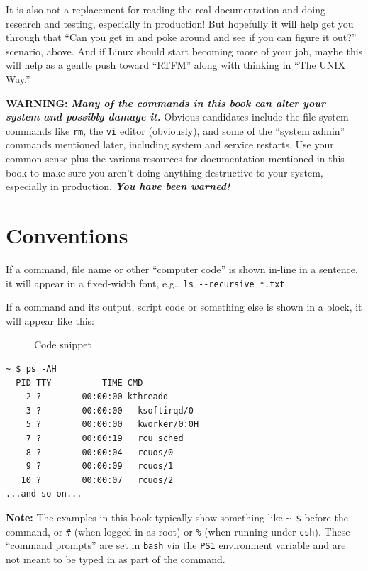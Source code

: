 \documentclass[10pt,]{book}
\numberwithin{figure}{chapter}
\DeclareRobustCommand{\drcap}[1]{\begin{figure}[H]\caption{#1}\end{figure}}
\DeclareRobustCommand{\drenv}[1]{\index{Environment Variables!#1}}
\begin{document}
It is also not a replacement for reading the real documentation and
doing research and testing, especially in production! But hopefully it
will help get you through that ``Can you get in and poke around and see
if you can figure it out?'' scenario, above. And if Linux should start
becoming more of your job, maybe this will help as a gentle push toward
``RTFM'' along with thinking in ``The UNIX Way.''

\textbf{WARNING:} \textbf{\emph{Many of the commands in this book can
alter your system and possibly damage it.}} Obvious candidates include
the file system commands like \texttt{rm}, the \texttt{vi} editor
(obviously), and some of the ``system admin'' commands mentioned later,
including system and service restarts. Use your common sense plus the
various resources for documentation mentioned in this book to make sure
you aren't doing anything destructive to your system, especially in
production. \textbf{\emph{You have been warned!}}

\section{Conventions}\label{conventions}

If a command, file name or other ``computer code'' is shown in-line in a
sentence, it will appear in a fixed-width font, e.g.,
\texttt{ls -{}-recursive *.txt}.

If a command and its output, script code or something else is shown in a
block, it will appear like this:

\drcap{Code snippet}

\begin{verbatim}
~ $ ps -AH
  PID TTY          TIME CMD
    2 ?        00:00:00 kthreadd
    3 ?        00:00:00   ksoftirqd/0
    5 ?        00:00:00   kworker/0:0H
    7 ?        00:00:19   rcu_sched
    8 ?        00:00:04   rcuos/0
    9 ?        00:00:09   rcuos/1
   10 ?        00:00:07   rcuos/2
...and so on...
\end{verbatim}

\textbf{Note:} The examples in this book typically show something like
\texttt{\textasciitilde{} \$} before the command, or \texttt{\#} (when
logged in as root) or \texttt{\%} (when running under \texttt{csh}).
These ``command prompts'' are set in \texttt{bash} via the
\href{https://www.linux.com/learn/docs/ldp/443-bash-prompt-howto}{\texttt{PS1}
environment variable}\drenv{PS1} and are not meant to be typed in as
part of the command.
\end{document}
